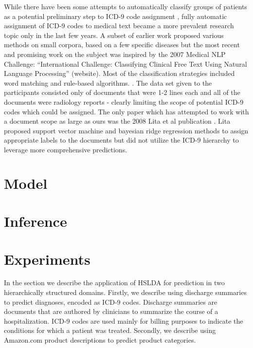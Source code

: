 \documentclass{article}
\begin{document}
While there have been some attempts to automatically classify groups
of patients as a potential preliminary step to ICD-9 code assignment
\citep{Ruch2008,FreitasJunior2006,RibeiroNeto2001,Brown2006}, fully
automatic assignment of ICD-9 codes to medical text became a more
prevalent research topic only in the last few years. A subset of earlier
work proposed various methods on small corpora, based on a few specific
diseases \citep{Rao2003} but the most recent and promising work on
the subject was inspired by the 2007 Medical NLP Challenge: {}``International
Challenge: Classifying Clinical Free Text Using Natural Language Processing\textquotedblright{}
(website). Most of the classification strategies included word matching
and rule-based algorithms. \citep{Goldstein2007,Crammer2007,Farkas2008}.
The data set given to the participants consisted only of documents
that were 1-2 lines each and all of the documents were radiology reports
- clearly limiting the scope of potential ICD-9 codes which could
be assigned. The only paper which has attempted to work with a document
scope as large as ours was the 2008 Lita et al publication \citep{Lita2008}.
Lita proposed support vector machine and bayesian ridge regression
methods to assign appropriate labels to the documents but did not
utilize the ICD-9 hierarchy to leverage more comprehensive predictions.


\section{Model}
\label{sec:model}


\section{Inference}
\label{sec:inference}

\section{Experiments}

\label{sec:experiments}

In the section we describe the application of HSLDA for prediction
in two hierarchically structured domains. Firstly, we describe using
discharge summaries to predict diagnoses, encoded as ICD-9 codes.
Discharge summaries are documents that are authored by clinicians
to summarize the course of a hospitalization. ICD-9 codes are used
mainly for billing purposes to indicate the conditions for which a
patient was treated. Secondly, we describe using Amazon.com product
descriptions to predict product categories.
\end{document}
